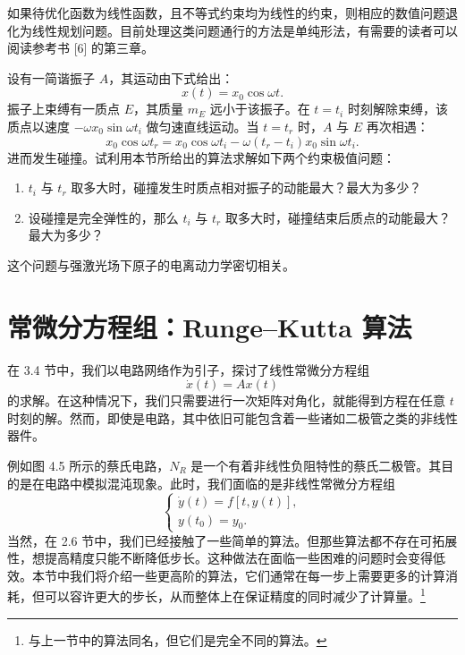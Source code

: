 如果待优化函数为线性函数，且不等式约束均为线性的约束，则相应的数值问题退化为线性规划问题。目前处理这类问题通行的方法是单纯形法，有需要的读者可以阅读参考书 [6] 的第三章。

\begin{exerciseBox}[练习 4.2]
设有一简谐振子 $A$，其运动由下式给出：
\[
x(t)=x_0\cos\omega t.
\]
振子上束缚有一质点 $E$，其质量 $m_E$ 远小于该振子。在 $t=t_i$ 时刻解除束缚，该质点以速度 $-\omega x_0\sin\omega t_i$ 做匀速直线运动。当 $t=t_r$ 时，$A$ 与 $E$ 再次相遇：
\[
x_0\cos\omega t_r=x_0\cos\omega t_i-\omega(t_r-t_i)x_0\sin\omega t_i.
\]
进而发生碰撞。试利用本节所给出的算法求解如下两个约束极值问题：
\begin{enumerate}[label=(\arabic*)]
\item $t_i$ 与 $t_r$ 取多大时，碰撞发生时质点相对振子的动能最大？最大为多少？
\item 设碰撞是完全弹性的，那么 $t_i$ 与 $t_r$ 取多大时，碰撞结束后质点的动能最大？最大为多少？
\end{enumerate}
这个问题与强激光场下原子的电离动力学密切相关。
\end{exerciseBox}

\section{常微分方程组：Runge--Kutta 算法}

在 3.4 节中，我们以电路网络作为引子，探讨了线性常微分方程组
\begin{equation}
\dot x(t)=Ax(t)
\tag{4.3.1}
\end{equation}
的求解。在这种情况下，我们只需要进行一次矩阵对角化，就能得到方程在任意 $t$ 时刻的解。然而，即使是电路，其中依旧可能包含着一些诸如二极管之类的非线性器件。

例如图 4.5 所示的蔡氏电路，$N_R$ 是一个有着非线性负阻特性的蔡氏二极管。其目的是在电路中模拟混沌现象。此时，我们面临的是非线性常微分方程组
\begin{equation}
\begin{cases}
\dot y(t)=f[t,y(t)],\\
y(t_0)=y_0.
\end{cases}
\tag{4.3.2}
\end{equation}
当然，在 2.6 节中，我们已经接触了一些简单的算法。但那些算法都不存在可拓展性，想提高精度只能不断降低步长。这种做法在面临一些困难的问题时会变得低效。本节中我们将介绍一些更高阶的算法，它们通常在每一步上需要更多的计算消耗，但可以容许更大的步长，从而整体上在保证精度的同时减少了计算量。\footnote{与上一节中的算法同名，但它们是完全不同的算法。}



